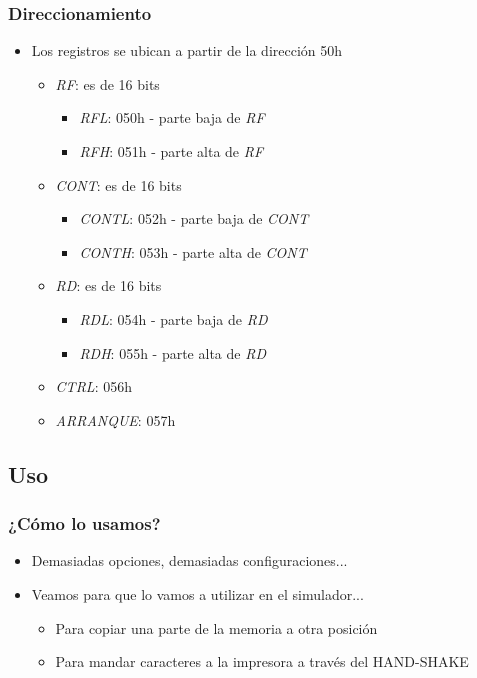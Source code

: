 \documentclass{beamer}
\begin{document}
\begin{frame}
\frametitle{Direccionamiento}
  \begin{itemize}
     \item Los registros se ubican a partir de la dirección 50h
     \begin{itemize}
        \item \emph{RF}: es de 16 bits 
	\begin{itemize}
	  \item \emph{RFL}: 050h - parte baja de \emph{RF}
	  \item \emph{RFH}: 051h - parte alta de \emph{RF}
	\end{itemize}
        \item \emph{CONT}: es de 16 bits 
	\begin{itemize}
	  \item \emph{CONTL}: 052h - parte baja de \emph{CONT}
	  \item \emph{CONTH}: 053h - parte alta de \emph{CONT}
	\end{itemize}
        \item \emph{RD}: es de 16 bits 
	\begin{itemize}
	  \item \emph{RDL}: 054h - parte baja de \emph{RD}
	  \item \emph{RDH}: 055h - parte alta de \emph{RD}
	\end{itemize}
        \item \emph{CTRL}: 056h
        \item \emph{ARRANQUE}: 057h
     \end{itemize}
  \end{itemize}
 
\end{frame}

\subsection{Uso}
\begin{frame}
\frametitle{¿Cómo lo usamos?}
  \begin{itemize}
     \item Demasiadas opciones, demasiadas configuraciones...
     \item Veamos para que lo vamos a utilizar en el simulador...
     \begin{itemize}
	\item Para copiar una parte de la memoria a otra posición
        \item Para mandar caracteres a la impresora a través del HAND-SHAKE
     \end{itemize}
  \end{itemize}
\end{frame}
\end{document}
